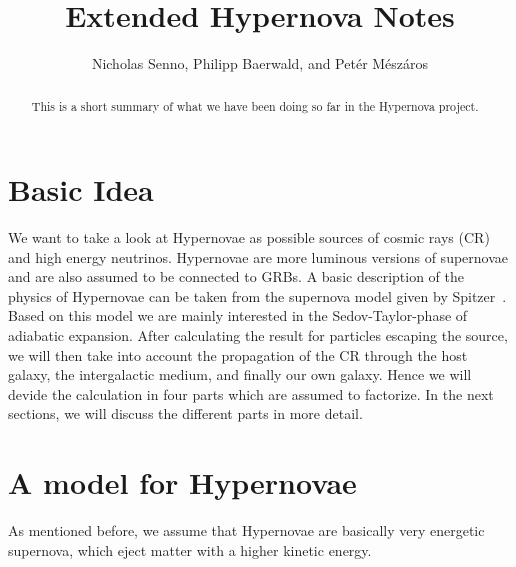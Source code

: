 \documentclass[a4paper,10pt]{article}
\title{Extended Hypernova Notes}
\author{Nicholas Senno, Philipp Baerwald, and Pet\'{e}r M\'{e}sz\'{a}ros}
\begin{document}
\maketitle

\begin{abstract}
	This is a short summary of what we have been doing so far in the Hypernova project.
\end{abstract}

\section{Basic Idea}

We want to take a look at Hypernovae as possible sources of cosmic rays (CR) and high energy neutrinos. Hypernovae are more luminous versions of supernovae and are also assumed to be connected to GRBs. A basic description of the physics of Hypernovae can be taken from the supernova model given by Spitzer~\cite{1998ppim.book.....S}. Based on this model we are mainly interested in the Sedov-Taylor-phase of adiabatic expansion. After calculating the result for particles escaping the source, we will then take into account the propagation of the CR through the host galaxy, the intergalactic medium, and finally our own galaxy. Hence we will devide the calculation in four parts which are assumed to factorize.
In the next sections, we will discuss the different parts in more detail.

\section{A model for Hypernovae}

As mentioned before, we assume that Hypernovae are basically very energetic supernova, which eject matter with a higher kinetic energy.



\end{document}
